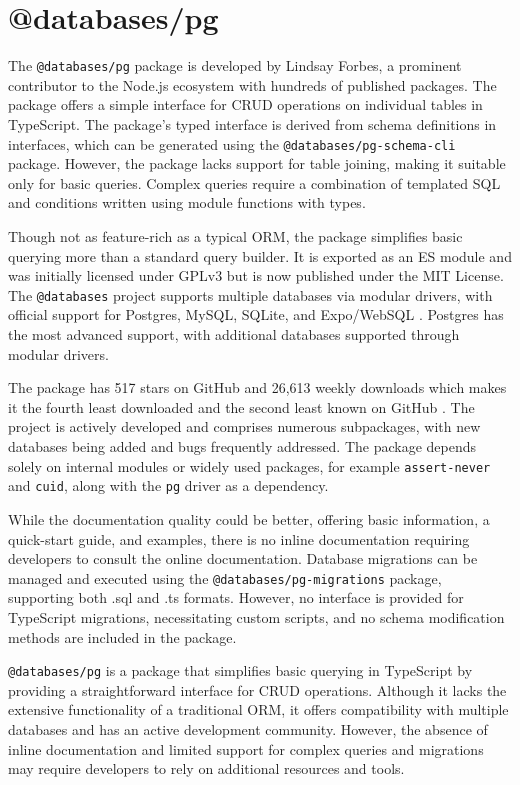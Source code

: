 \section{@databases/pg}
The \texttt{@databases/pg} package is developed by Lindsay Forbes, a prominent
contributor to the Node.js ecosystem with hundreds of published packages. The
package offers a simple interface for CRUD operations on individual tables in
TypeScript. The package's typed interface is derived from schema definitions in
interfaces, which can be generated using the \texttt{@databases/pg-schema-cli}
\cite{pg-schema-cli} package. However, the package lacks support for table
joining, making it suitable only for basic queries. Complex queries require a
combination of templated SQL and conditions written using module functions with
types.

Though not as feature-rich as a typical ORM, the package simplifies basic
querying more than a standard query builder. It is exported as an ES module and
was initially licensed under GPLv3 but is now published under the MIT License.
The \texttt{@databases} project supports multiple databases via modular drivers,
with official support for Postgres, MySQL, SQLite, and Expo/WebSQL
\cite{databases/pg}. Postgres has the most advanced support, with additional
databases supported through modular drivers.

The package has 517 stars on GitHub and 26,613 weekly downloads which makes it
the fourth least downloaded and the second least known on GitHub
\cite{databases/pg/npm}. The project is actively developed and comprises
numerous subpackages, with new databases being added and bugs frequently
addressed. The package depends solely on internal modules or widely used
packages, for example \texttt{assert-never} and \texttt{cuid}, along with the
\texttt{pg} driver as a dependency.

While the documentation quality could be better, offering basic information, a
quick-start guide, and examples, there is no inline documentation requiring
developers to consult the online documentation. Database migrations can be
managed and executed using the \texttt{@databases/pg-migrations} package,
supporting both .sql and .ts formats. However, no interface is provided for
TypeScript migrations, necessitating custom scripts, and no schema modification
methods are included in the package.

\texttt{@databases/pg} is a package that simplifies basic querying in TypeScript
by providing a straightforward interface for CRUD operations. Although it lacks
the extensive functionality of a traditional ORM, it offers compatibility with
multiple databases and has an active development community. However, the absence
of inline documentation and limited support for complex queries and migrations
may require developers to rely on additional resources and tools.


